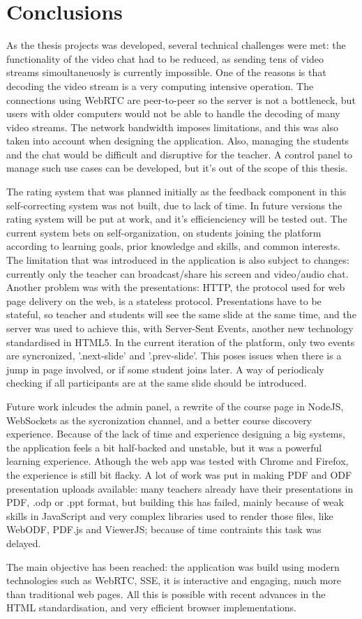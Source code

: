 \section*{Conclusions}
As the thesis projects was developed, several technical challenges were met:
the functionality of the video chat had to be reduced, as sending tens
of video streams simoultaneuosly is currently impossible.
One of the reasons is that  decoding the video stream is a very computing
intensive operation. The connections using WebRTC are peer-to-peer so the server
is not a bottleneck, but users with older computers would not be able to handle
the decoding of many video streams. The network bandwidth imposes limitations,
and this was also taken into account when designing the application.
Also, managing the students and the chat would be difficult and disruptive for
the teacher.
A control panel to manage such use cases can be developed, but it's
out of the scope of this thesis.

The rating system that was planned initially as the feedback component in this
self-correcting system was not built, due to lack of time. In future versions
the rating system will be put at work, and it's efficienciency will be tested out.
The current system bets on self-organization, on students joining the platform
according to learning goals, prior knowledge and skills, and common interests.
The limitation that was introduced in the application is also subject to changes:
currently only the teacher can broadcast/share his screen and video/audio chat.
Another problem was with the presentations: HTTP, the protocol used for web page
delivery on the web, is a stateless protocol. Presentations have to be stateful,
so teacher and students will see the same slide at the same time, and the server
was used to achieve this, with Server-Sent Events, another new technology
standardised in HTML5. In the current iteration of the platform, only two events
are syncronized, '.next-slide' and '.prev-slide'. This poses issues when there is
a jump in page involved, or if some student joins later. A way of periodicaly checking
if all participants are at the same slide should be introduced.

Future work inlcudes the admin panel, a rewrite of the course page in NodeJS,
WebSockets as the sycronization channel, and a better course discovery experience.
Because of the lack of time and experience designing a big systems, the application
feels a bit half-backed and unstable, but it was a powerful learning experience.
Athough the web app was tested with Chrome and Firefox, the experience is still
bit flacky.
A lot of work was put in making PDF and ODF presentation uploads available: many
teachers already have their presentations in PDF, .odp or .ppt format, but building
this has failed, mainly because of weak skills in JavaScript and very complex libraries
used to render those files, like WebODF, PDF.js and ViewerJS; because of time contraints this
task was delayed.

The main objective has been reached: the application was build using modern
technologies such as WebRTC, SSE, it is interactive and engaging, much more than
traditional web pages. All this is possible with recent advances in the HTML
standardisation, and very efficient browser implementations.
\clearpage
